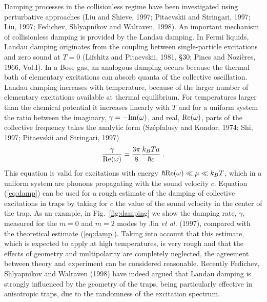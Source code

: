Damping processes in the collisionless regime have been investigated 
using  perturbative approaches (Liu
and Shieve, 1997; Pitaevskii and Stringari, 1997; Liu, 1997; Fedichev, 
Shlyapnikov and Walraven, 1998). An important mechanism of collisionless 
damping is provided by the Landau damping. In Fermi liquids, Landau damping 
originates from the coupling between single-particle excitations and 
zero sound at $T=0$ (Lifshitz and Pitaevskii, 1981, \S 30; Pines and 
Nozi\`eres, 1966, Vol.I). In a Bose gas, an analogous damping occurs because 
the thermal bath  of elementary excitations can absorb quanta of the 
collective oscillation. Landau damping  increases with temperature,
because of the larger number of elementary excitations  available at
thermal equilibrium. For temperatures larger than the chemical 
potential  it increases linearly with $T$ and for a uniform system the 
ratio between the imaginary, $\gamma= - {\rm Im}(\omega)$, and real, 
${\rm Re}(\omega)$, parts of the collective frequency takes the analytic 
form (Sz\'{e}pfalusy and Kondor, 1974; Shi, 1997; Pitaevskii and 
Stringari, 1997)
\begin{equation}
\frac{\gamma}{{\rm Re}(\omega)} = \frac{3\pi}{8}\frac{k_BTa}{\hbar c} \; .
\label{eq:damp}
\end{equation}
This equation is valid for excitations with energy $\hbar {\rm Re}
(\omega) \ll \mu \ll k_BT$, which in a uniform system are phonons 
propagating with the sound  velocity $c$. Equation (\ref{eq:damp}) can 
be used for a rough estimate of the damping of collective excitations 
in traps by taking for $c$ the value of the sound velocity in the center 
of the trap. As an example, in Fig.~\ref{fig:damping} we show the damping 
rate, $\gamma$, measured for the $m=0$ and $m=2$ modes by Jin {\it et al.}
(1997), compared with the theoretical estimate (\ref{eq:damp}). Taking 
into account that this estimate, which is expected to apply at high 
temperatures, is very rough and that the effects  of geometry and 
multipolarity are completely neglected, the agreement between theory 
and experiment can be considered reasonable. Recently Fedichev, 
Shlyapnikov and Walraven (1998) have indeed argued that Landau damping 
is strongly influenced by the geometry of the traps, being particularly 
effective in anisotropic traps, due to the randomness of  the excitation 
spectrum. 

